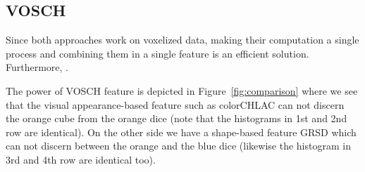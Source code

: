 \documentclass[conference]{sty/IEEEtran}
\begin{document}
\subsection{VOSCH}
\label{sec:VOSCH}
Since both approaches work on voxelized data, making their computation a single process
and combining them in a single feature is an efficient solution. Furthermore,
.

The power of VOSCH feature is depicted in Figure~\ref{fig:comparison}
where we see that the visual appearance-based feature such as colorCHLAC can not
discern the orange cube from the orange dice (note that the histograms in 1st and
2nd row are identical). On the other side we have a shape-based feature GRSD
which can not discern between the orange and the blue dice (likewise the
histogram in 3rd and 4th row are identical too).
\end{document}
